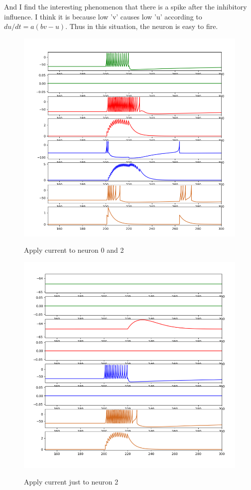 \documentclass[12pt]{article}
\begin{document}
And I find the interesting phenomenon that there is a spike after the inhibitory influence. I think it is because low 'v' causes low 'u' according to $du/dt = a(bv-u)$. Thus in this situation, the neuron is easy to fire.
\begin{figure}[H]
  \centering
  \includegraphics[width=.8\textwidth]{h3_p1_p5_1.png} %
  \label{img} %
  \caption{Apply current to neuron 0 and 2 }
\end{figure}
\begin{figure}[H]
  \centering
  \includegraphics[width=.8\textwidth]{h3_p1_p5_2.png} %
  \label{img} %
  \caption{Apply current just to neuron 2 }
\end{figure}
\end{document}
